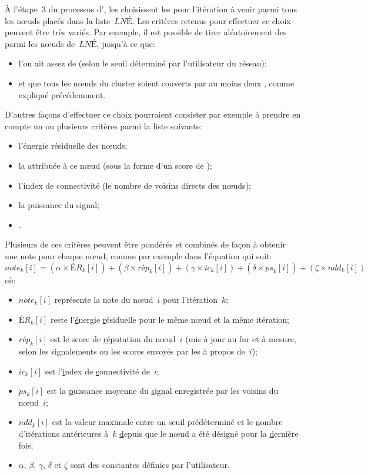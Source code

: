 À l'étape~3 du processus d'\election, les \chs choisissent les \cns pour l'itération à venir parmi tous les nœuds placés dans la liste~$\mathit{LNÉ}$.
Les critères retenus pour effectuer ce choix peuvent être très variés.
Par exemple, il est possible de tirer aléatoirement des \cns parmi les nœuds de~$\mathit{LNÉ}$, jusqu'à ce que:
\begin{itemize}
    \item l'on ait assez de \cns (selon le seuil déterminé par l'utilisateur du réseau);
    \item et que tous les nœuds du cluster soient couverts par au moins deux \cns, comme expliqué précédemment.
\end{itemize}
D'autres façons d'effectuer ce choix pourraient consister par exemple à prendre en compte un ou plusieurs critères parmi la liste suivante:
\begin{itemize}
    \item l'énergie résiduelle des nœuds;
    \item la  attribuée à ce nœud (sous la forme d'un score de \reput);
    \item l'index de connectivité (le nombre de voisins directs des nœuds);
    \item la puissance du signal;
    \item \etc.
\end{itemize}
Plusieurs de ces critères peuvent être pondérés et combinés de façon à obtenir une note pour chaque nœud, comme par exemple dans l'équation qui suit:%
\begin{equation*}
    \label{se:eqn:score}
    \mathit{note}_k[i] = (\alpha \times \mathit{ÉR}_k[i]) + (\beta \times \mathit{rép}_k[i]) + (\gamma \times \mathit{ic}_k[i]) + (\delta \times \mathit{ps}_k[i]) + (\zeta \times \mathit{ndd}_k[i])
\end{equation*}
où:
\begin{itemize}
    \item $\mathit{note}_k[i]$ représente la note du nœud~$i$ pour l'itération~$k$;
    \item $\mathit{ÉR}_k[i]$ reste l'\underline{é}nergie \underline{r}ésiduelle pour le même nœud et la même itération;
    \item $\mathit{rép}_k[i]$ est le score de \underline{rép}utation du nœud~$i$ (mis à jour au fur et à mesure, selon les signalements ou les scores envoyés par les \cns à propos de~$i$);
    \item $\mathit{ic}_k[i]$ est l'\underline{i}ndex de \underline{c}onnectivité de~$i$;
    \item $ps_k[i]$ est la \underline{p}uissance moyenne du \underline{s}ignal enregistrée par les voisins du nœud~$i$;
    \item $ndd_k[i]$ est la valeur maximale entre un seuil prédéterminé et le \underline{n}ombre d'itérations antérieures à~$k$ \underline{d}epuis que le nœud a été désigné \cn pour la \underline{d}ernière fois;
    \item $\alpha$, $\beta$, $\gamma$, $\delta$ et $\zeta$ sont des constantes définies par l'utilisateur.
\end{itemize}
